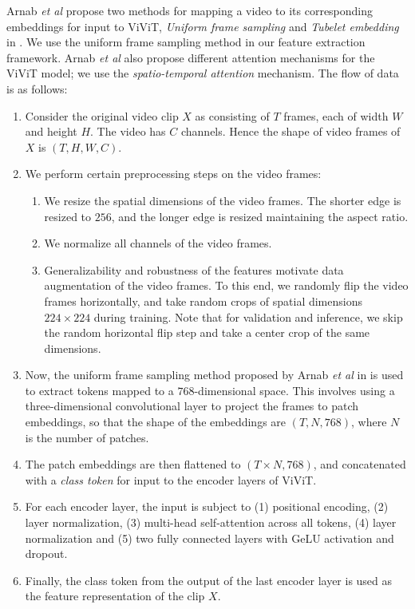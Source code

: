 
\par Arnab \textit{et al} propose two methods for mapping a video to its corresponding embeddings for input to ViViT, \textit{Uniform frame sampling} and \textit{Tubelet embedding} in \cite{vivit}. We use the uniform frame sampling method in our feature extraction framework. Arnab \textit{et al} also propose different attention mechanisms for the ViViT model; we use the \textit{spatio-temporal attention} mechanism. The flow of data is as follows:

\begin{enumerate}
	\item Consider the original video clip $X$ as consisting of $T$ frames, each of width $W$ and height $H$. The video has $C$ channels. Hence the shape of video frames of $X$ is $(T, H, W, C)$.
	\item We perform certain preprocessing steps on the video frames:
	\begin{enumerate}
		\item We resize the spatial dimensions of the video frames. The shorter edge is resized to $256$, and the longer edge is resized maintaining the aspect ratio.
		\item We normalize all channels of the video frames.
		\item Generalizability and robustness of the features motivate data augmentation of the video frames. To this end, we randomly flip the video frames horizontally, and take random crops of spatial dimensions $224 \times 224 $ during training. Note that for validation and inference, we skip the random horizontal flip step and take a center crop of the same dimensions.
	\end{enumerate}
	\item Now, the uniform frame sampling method proposed by Arnab \textit{et al} in 
\cite{vivit} is used to extract tokens mapped to a $768$-dimensional space. This involves using a three-dimensional convolutional layer to project the frames to patch embeddings, so that the shape of the embeddings are $(T, N, 768)$, where $N$ is the number of patches.
	\item The patch embeddings are then flattened to $(T \times N, 768)$, and concatenated with a \textit{class token} for input to the encoder layers of ViViT.
	\item For each encoder layer, the input is subject to (1) positional encoding, (2) layer normalization, (3) multi-head self-attention across all tokens, (4) layer normalization and (5) two fully connected layers with GeLU activation and dropout.
	\item Finally, the class token from the output of the last encoder layer is used as the feature representation of the clip $X$.
\end{enumerate}


